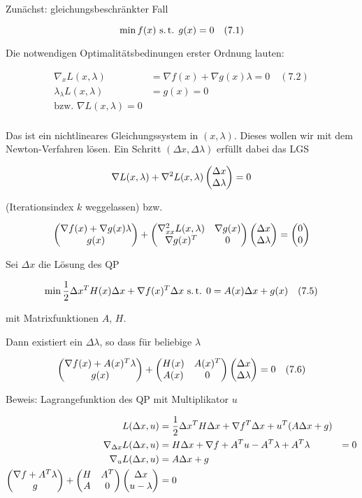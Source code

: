 
Zunächst: gleichungsbeschränkter Fall

\[ \min f(x) \text{ s.\,t. } g(x) = 0 \quad (7.1) \]

Die notwendigen Optimalitätsbedinungen erster Ordnung lauten:

\begin{align*}
\nabla_x L(x,\lambda) &= \nabla f(x) + \nabla g(x) \lambda = 0 \quad (7.2) \\
\lambda_\lambda L(x,\lambda) &= g(x) = 0 \\
\text{bzw. } \nabla L(x,\lambda) = 0 \\
\end{align*}

Das ist ein nichtlineares Gleichungssystem in $(x,\lambda)$. Dieses wollen wir mit dem Newton-Verfahren lösen. Ein Schritt $(\Delta x, \Delta \lambda)$ erfüllt dabei das LGS

\[ \nabla L(x,\lambda) + \nabla^2 L(x,\lambda) \begin{pmatrix} \Delta x \\ \Delta \lambda \end{pmatrix} = 0 \]

(Iterationsindex $k$ weggelassen) bzw.

\[ \begin{pmatrix} \nabla f(x) + \nabla g(x) \lambda \\ g(x) \end{pmatrix}      +     \begin{pmatrix} \nabla_{xx}^2 L(x,\lambda) & \nabla g(x) \\ \nabla g(x)^T & 0 \end{pmatrix}      \begin{pmatrix} \Delta x \\ \Delta \lambda \end{pmatrix}     =    \begin{pmatrix} 0 \\ 0 \end{pmatrix} \]


Sei $\Delta x$ die Lösung des QP

\[ \min \frac 12 \Delta x^T H(x) \Delta x + \nabla f(x)^T \Delta x \text{ s.\,t. } 0 = A(x) \Delta x + g(x) \quad (7.5) \]

mit Matrixfunktionen $A$, $H$.

Dann existiert ein $\Delta \lambda$, so dass für beliebige $\lambda$

\[ \begin{pmatrix} \nabla f(x) + A(x)^T \lambda \\ g(x) \end{pmatrix}   +   \begin{pmatrix} H(x) & A(x)^T \\ A(x) & 0 \end{pmatrix}   \begin{pmatrix} \Delta x \\ \Delta \lambda \end{pmatrix}   = 0 \quad (7.6) \]

Beweis: Lagrangefunktion des QP mit Multiplikator $u$

\begin{align*}
L(\Delta x, u) &= \frac 12 \Delta x^T H \Delta x + \nabla f^T \Delta x + u^T(A\Delta x + g) \\
\nabla_{\Delta x} L(\Delta x, u) &= H\Delta x + \nabla f + A^T u - A^T \lambda + A^T \lambda &= 0 \\
\nabla_u L(\Delta x, u) &= A \Delta x + g \\
\begin{pmatrix} \nabla f + A^T \lambda \\ g \end{pmatrix}   +   \begin{pmatrix} H & A^T \\ A & 0 \end{pmatrix}   \begin{pmatrix} \Delta x \\ u-\lambda \end{pmatrix}   &= 0 \\
\end{align*}

